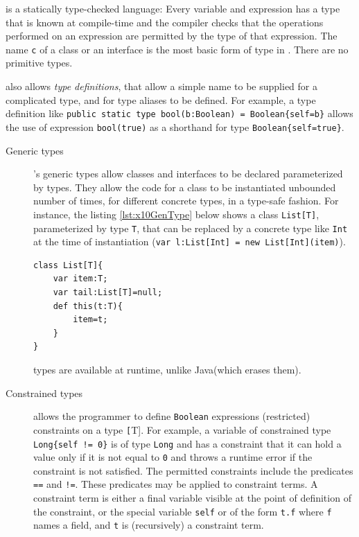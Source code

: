 \xten is a statically type-checked language: Every variable and expression has 
a type that is known at compile-time and the compiler checks that the operations
performed on an expression are permitted by the type of that expression. 
The name \texttt{c} of a class or an interface is the most basic form of type in
\xten. There are no primitive types. 

\xten also allows \emph{type definitions}, that allow a simple name to be
supplied for a complicated type, and for type aliases to be defined. For
example, a type definition like \texttt{public static type bool(b:Boolean) =
Boolean\{self=b\}} allows the use of expression \texttt{bool(true)} as a
shorthand for type \texttt{Boolean\{self=true\}}.

\begin{description}

\item[Generic types] \xten's generic types allow classes and interfaces to be
declared parameterized by types. They allow the code for a class to be
instantiated 
unbounded number of times, for different concrete types, in a type-safe fashion. 
For instance, the listing \ref{lst:x10GenType} below shows a class 
\texttt{List[T]}, parameterized by
type \texttt{T}, that can be replaced by a concrete type like \texttt{Int} at
the time of instantiation (\texttt{var l:List[Int] = new List[Int](item)}).
\begin{lstlisting}[caption={},label={lst:x10GenType},language=x10,numbers=none]
class List[T]{
	var item:T;
	var tail:List[T]=null;
	def this(t:T){
		item=t;
	}
}
\end{lstlisting}
\xten types are available at runtime, unlike Java(which erases them). 

\item[Constrained types] \xten allows the programmer to define \texttt{Boolean}
expressions (restricted) constraints on a type \texttt[T]. For example, a
variable of constrained type \texttt{Long\{self != 0\}} is of type \texttt{Long}
and has a constraint that it can hold a value only if it is not equal to
\texttt{0} and throws a runtime error if the constraint is not
satisfied. The permitted constraints include the predicates \texttt{==} and
\texttt{!=}. These
predicates may be applied to constraint terms. A constraint term is either a
final variable visible at the point of definition of the constraint, or the
special variable \texttt{self} or of the form \texttt{t.f} where \texttt{f} 
names a field, and \texttt{t} is
(recursively) a constraint term.  

\end{description} 

